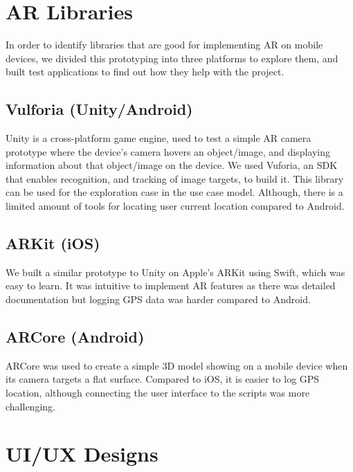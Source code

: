 
\section{AR Libraries}
In order to identify libraries that are good for implementing AR on mobile devices, we divided this prototyping into three platforms to explore them, and built test applications to find out how they help with the project.

\subsection*{Vulforia (Unity/Android)}
Unity is a cross-platform game engine, used to test a simple AR camera prototype where the device's camera hovers an object/image, and displaying information about that object/image on the device. We used Vuforia, an SDK that enables recognition, and tracking of image targets, to build it. This library can be used for the exploration case in the use case model. Although, there is a limited amount of tools for locating user current location compared to Android.

\subsection*{ARKit (iOS)}
We built a similar prototype to Unity on Apple's ARKit using Swift, which was easy to learn. It was intuitive to implement AR features as there was detailed documentation but logging GPS data was harder compared to Android.

\subsection*{ARCore (Android)}
ARCore was used to create a simple 3D model showing on a mobile device when its camera targets a flat surface. Compared to iOS, it is easier to log GPS location, although connecting the user interface to the scripts was more challenging.

\section{UI/UX Designs}